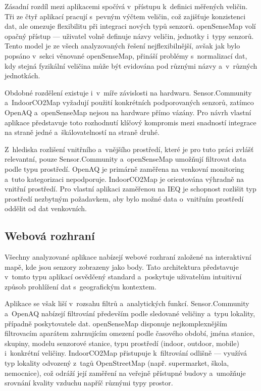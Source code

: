 Zásadní rozdíl mezi aplikacemi spočívá v~přístupu k~definici měřených veličin. Tři ze čtyř aplikací pracují s~pevným výčtem veličin, což zajišťuje konzistenci dat, ale omezuje flexibilitu při integraci nových typů senzorů. openSenseMap volí opačný přístup --- uživatel volně definuje názvy veličin, jednotky i~typy senzorů. Tento model je ze všech analyzovaných řešení nejflexibilnější, avšak jak bylo popsáno v~sekci věnované openSenseMap, přináší problémy s~normalizací dat, kdy stejná fyzikální veličina může být evidována pod různými názvy a~v~různých jednotkách.

Obdobné rozdělení existuje i~v~míře závislosti na hardwaru. Sensor.Community a~IndoorCO2Map vyžadují použití konkrétních podporovaných senzorů, zatímco OpenAQ a~openSenseMap nejsou na hardware přímo vázány. Pro návrh vlastní aplikace představuje toto rozhodnutí klíčový kompromis mezi snadností integrace na straně jedné a~škálovatelností na straně druhé.

Z~hlediska rozlišení vnitřního a~vnějšího prostředí, které je pro tuto práci zvlášť relevantní, pouze Sensor.Community a~openSenseMap umožňují filtrovat data podle typu prostředí. OpenAQ je primárně zaměřena na venkovní monitoring a~tuto kategorizaci nepodporuje. IndoorCO2Map je orientována výhradně na vnitřní prostředí. Pro vlastní aplikaci zaměřenou na IEQ je schopnost rozlišit typ prostředí nezbytným požadavkem, aby bylo možné data o~vnitřním prostředí oddělit od dat venkovních.

\FloatBarrier
\subsection{Webová rozhraní}

Všechny analyzované aplikace nabízejí webové rozhraní založené na interaktivní mapě, kde jsou senzory zobrazeny jako body. Tato architektura představuje v~tomto typu aplikací osvědčený standard a~poskytuje uživatelům intuitivní způsob prohlížení dat s~geografickým kontextem.

Aplikace se však liší v~rozsahu filtrů a~analytických funkcí. Sensor.Community a~OpenAQ nabízejí filtrování především podle sledované veličiny a~typu lokality, případně poskytovatele dat. openSenseMap disponuje nejkomplexnějším filtrovacím aparátem zahrnujícím omezení podle časového období, jména stanice, skupiny, modelu senzorové stanice, typu prostředí (indoor, outdoor, mobile) i~konkrétní veličiny. IndoorCO2Map přistupuje k~filtrování odlišně --- využívá typ lokality odvozený z~tagů OpenStreetMap (např. supermarket, škola, nemocnice), což odráží její zaměření na veřejně přístupné budovy a~umožňuje srovnání kvality vzduchu napříč různými typy prostor.

